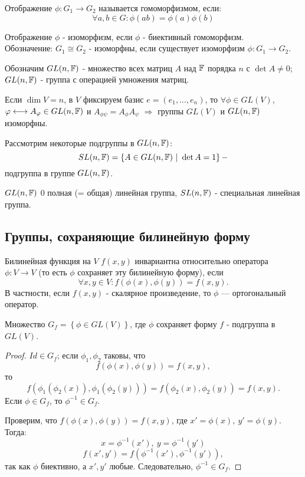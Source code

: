 \begin{definition}
    Отображение $\phi: G_1 \to G_2$ называется гомоморфизмом, если: 
    $$\forall a,b \in G: \phi(ab) = \phi(a)\phi(b)$$
\end{definition} 

\begin{definition}
    Отображение $\phi$ - изоморфизм, если $\phi$ - биективный гомоморфизм.\\
    Обозначение: $G_1 \cong G_2$ - изоморфны, если существует изоморфизм $\phi: G_1 \to G_2$.
\end{definition} 

\begin{example1}
    Обозначим $GL(n, \mathbb{F})$ - множество всех матриц $A$ над $\mathbb{F}$ порядка $n$ с $\det{A} \neq 0$; $GL(n, \mathbb{F})$ - группа с операцией умножения матриц.

    Если $\dim{V} = n$, в $V$ фиксируем базис $e = (e_1, \dots, e_n)$, то $\forall \phi \in GL(V)$, $\varphi \longleftrightarrow A_{\varphi} \in GL(n, \mathbb{F})$ и $A_{\phi \psi} = A_{\phi}A_{\psi}$ $\Longrightarrow$ группы $GL(V)$ и $GL(n, \mathbb{F})$ изоморфны.

    Рассмотрим некоторые подгруппы в $GL(n, \mathbb{F})$:
    \[SL(n, \mathbb{F}) = \left\{A \in GL(n, \mathbb{F}) \ | \ \det{A} = 1\right\} - \]
    подгруппа  в группе $GL(n, \mathbb{F})$.

    $GL(n, \mathbb{F})$ 0 полная (= общая) линейная группа, $SL(n, \mathbb{F})$ - специальная линейная группа.
\end{example1}


\subsection{Группы, сохраняющие билинейную форму}
\begin{definition}
    Билинейная функция на $V$ $f(x,y)$ инвариантна относительно оператора $\phi: V \to V$ (то есть $\phi$ сохраняет эту билинейную форму), если \[\forall x, y \in V: f(\phi(x), \phi(y)) = f(x,y).\]
    В частности, если $f(x,y)$ - скалярное произведение, то $\phi$ — ортогональный оператор.
\end{definition} 

\begin{lemma}
    Множество $G_f = \left\{\phi \in GL(V)\right\}$, где $\phi$ сохраняет форму $f$ - подгруппа в $GL(V)$.
\end{lemma} 
\begin{proof}
    $Id \in G_f$; если $\phi_1, \phi_2$ таковы, что 
    \[f(\phi(x), \phi(y)) = f(x,y),\]
    то 
    \[f(\phi_1(\phi_2(x)), \phi_1(\phi_2(y))) = f(\phi_2(x), \phi_2(y)) = f(x,y).\]
    Если $\phi \in G_f$, то $\phi^{-1} \in G_f$.

    Проверим, что $f(\phi(x), \phi(y)) = f(x,y)$, где $x' = \phi(x), \ y' = \phi(y)$. Тогда: 
    $$x = \phi^{-1}(x'), \ y = \phi^{-1}(y')$$
    \[f(x',y') = f(\phi^{-1}(x'), \phi^{-1}(y')),\]
    так как $\phi$ биективно, а $x',y'$ любые. Следовательно, $\phi^{-1} \in G_f$.
\end{proof} 

